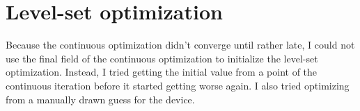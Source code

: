 \section{Level-set optimization}\label{sec:res_bin}

Because the continuous optimization didn't converge until rather late,
I could not use the final field of the continuous optimization to initialize the
level-set optimization.
Instead, I tried getting the initial value from a point of the continuous
iteration before it started getting worse again.
I also tried optimizing from a manually drawn guess for the device.

\begin{figure}[htpb]
	\centering
	\caption{}
	\label{fig:optimal_bin_design}
\end{figure}

\begin{figure}[htpb]
	\centering
	\caption{}
	\label{fig:convergence_plot_bin}
\end{figure}
